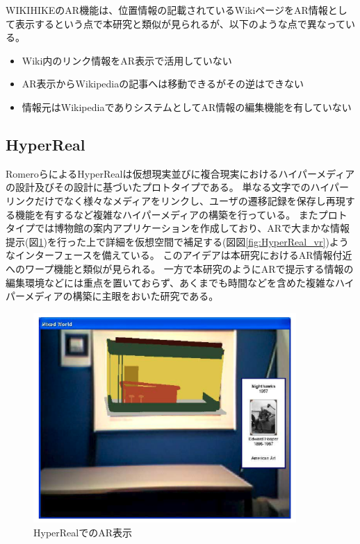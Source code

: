 WIKIHIKEのAR機能は、位置情報の記載されているWikiページをAR情報として表示するという点で本研究と類似が見られるが、以下のような点で異なっている。
\begin{itemize}
  \item Wiki内のリンク情報をAR表示で活用していない
  \item AR表示からWikipediaの記事へは移動できるがその逆はできない
  \item 情報元はWikipediaでありシステムとしてAR情報の編集機能を有していない
\end{itemize}


\subsection{HyperReal}
RomeroらによるHyperRealは\cite{10.1145/900051.900055}仮想現実並びに複合現実におけるハイパーメディアの設計及びその設計に基づいたプロトタイプである。
単なる文字でのハイパーリンクだけでなく様々なメディアをリンクし、ユーザの遷移記録を保存し再現する機能を有するなど複雑なハイパーメディアの構築を行っている。
またプロトタイプでは博物館の案内アプリケーションを作成しており、ARで大まかな情報提示(図\ref{fig:HyperReal_ar})を行った上で詳細を仮想空間で補足する(図図\ref{fig:HyperReal_vr})ようなインターフェースを備えている。
このアイデアは本研究におけるAR情報付近へのワープ機能と類似が見られる。
一方で本研究のようにARで提示する情報の編集環境などには重点を置いておらず、あくまでも時間などを含めた複雑なハイパーメディアの構築に主眼をおいた研究である。
\begin{figure}[h]
  \centering 
  \includegraphics[height=80mm]{images/HyperReal_ar.png}
  \caption{HyperRealでのAR表示} \label{fig:HyperReal_ar}
\end{figure}


